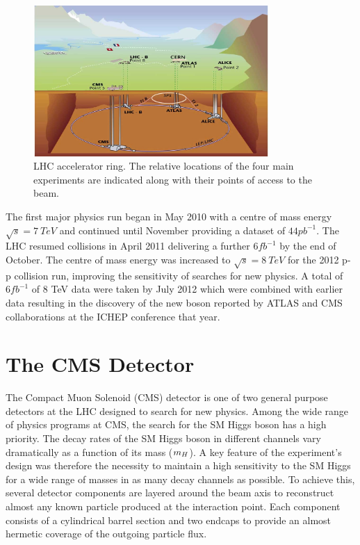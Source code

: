 \begin{figure}[htb!]
\begin{center}
\includegraphics[width=0.8\textwidth]{detector/CERN.jpg}
\caption{LHC accelerator ring. The relative locations of the four main experiments 
are indicated along with their points of access to the beam.}
\label{fig:lhcring}
\end{center}
\end{figure}

The first major physics run began in May 2010 with a centre of mass energy 
$\sqrt{s}=7~TeV$ and continued until November providing a dataset of $44pb^{-1}$.
The LHC resumed collisions in April 2011 delivering a further $6fb^{-1}$ by the end
of October. The centre of mass energy was increased to $\sqrt{s}=8~TeV$ for the 2012 p-p 
collision run, improving the sensitivity of searches for new physics. A total of
$6fb^{-1}$ of 8 TeV data were taken by July 2012 which were combined with earlier data resulting
in the discovery of the new boson reported by ATLAS and CMS collaborations at the ICHEP conference that year. 

\section{The CMS Detector}
\label{sec:cmsdetector}
The Compact Muon Solenoid (CMS) detector is one of two general purpose detectors at 
the LHC designed to search for new physics. 
Among the wide range of physics programs at CMS, the search for the SM Higgs boson 
has a high priority. The decay rates of the SM Higgs boson in different 
channels vary dramatically as a function of its mass ($m_{H}$). A key feature of the experiment's design
was therefore the necessity to maintain a high sensitivity to the SM Higgs for a wide range of masses in as many 
decay channels as possible. To achieve this, several detector components are layered around 
the beam axis to reconstruct almost any known particle produced at the interaction point.
Each component consists of a cylindrical barrel section and two endcaps 
to provide an almost hermetic coverage of the outgoing particle flux.


